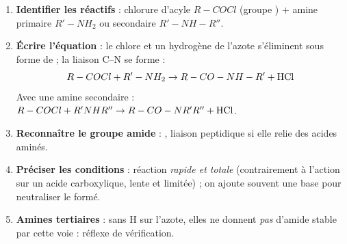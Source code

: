 \documentclass[11pt]{article}
\newcommand{\cle}[1]{{\popxbold\color{popdark}#1}}
\begin{document}
\begin{methode}
\begin{enumerate}
\item \textbf{Identifier les réactifs} : chlorure d'acyle $R-COCl$ (groupe ) + amine primaire $R'-NH_2$ ou secondaire $R'-NH-R''$.
\item \textbf{Écrire l'équation} : le chlore et un hydrogène de l'azote s'éliminent sous forme de  ; la liaison C--N se forme :
\[ R-COCl + R'-NH_2 \rightarrow R-CO-NH-R' + \ce{HCl} \]
Avec une amine secondaire : $R-COCl + R'NHR'' \rightarrow R-CO-NR'R'' + \ce{HCl}$.
\item \textbf{Reconnaître le groupe amide} : , liaison \cle{peptidique} si elle relie des acides aminés.
\item \textbf{Préciser les conditions} : réaction \emph{rapide et totale} (contrairement à l'action sur un acide carboxylique, lente et limitée) ; on ajoute souvent une base pour neutraliser le  formé.
\item \textbf{Amines tertiaires} : sans H sur l'azote, elles ne donnent \emph{pas} d'amide stable par cette voie : réflexe de vérification.
\end{enumerate}
\end{methode}
\end{document}
